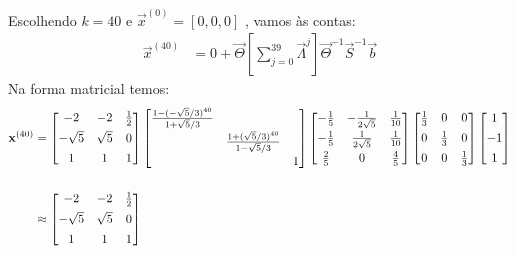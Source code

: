 \documentclass{homework}
\begin{document}
\begin{enumerate}[wide, leftmargin=80pt]
			Escolhendo $k = 40$ e $\vec{x}^{(0)} = \left[0, 0, 0\right]$ , vamos às contas:
			\begin{align*}
				\vec{x}^{(40)} &= 0 +  \vec{\Theta}\left[\sum_{j=0}^{39}\vec{\Lambda}^{j}\right]\vec{\Theta}^{-1} \vec{S}^{-1}\vec{b}
			\end{align*}
			Na forma matricial temos:
			\begin{align*}
				\vec{x}^{(40)} &=
				\left[ %
				\begin{array}{@{}ccc@{}}
				-2 & -2 & \frac{1}{2} \\[1ex]
				-\sqrt{5} & \sqrt{5} & 0 \\[1ex]
				1 & 1 & 1
				\end{array}
				\right] %
				\left[ %
				\begin{array}{@{}ccc@{}}
				\frac{1 - (-\sqrt{5}/3)^{40}}{1 + \sqrt{5}/3}& ~ & ~ \\[1ex]
				~ & \frac{1 + (\sqrt{5}/3)^{40}}{1 - \sqrt{5}/3} & ~ \\[1ex]
				~ & ~ & 1
				\end{array}
				\right] %
				\left[ %
				\begin{array}{@{}ccc@{}}
				-\frac{1}{5} & -\frac{1}{2 \sqrt{5}} & \frac{1}{10} \\[1ex]
				-\frac{1}{5} & \frac{1}{2 \sqrt{5}} & \frac{1}{10} \\[1ex]
				\frac{2}{5} & 0 & \frac{4}{5}
				\end{array}%
				\right]
				\left[%
				\begin{array}{@{}ccc@{}}
				\frac{1}{3} & 0 & 0 \\[1ex]
				0 & \frac{1}{3} & 0 \\[1ex]
				0 & 0 & \frac{1}{3}
				\end{array}
				\right]%
				\left[ %
				\begin{array}{@{}c@{}}
				1 \\[1ex]
				-1 \\[1ex]
				1 
				\end{array}
				\right]\\[0.5cm]
				&\approx
				\left[ %
				\begin{array}{@{}ccc@{}}
				-2 & -2 & \frac{1}{2} \\[1ex]
				-\sqrt{5} & \sqrt{5} & 0 \\[1ex]
				1 & 1 & 1 \\
				\end{array}
				\right] %

\end{align*}
\end{enumerate}
\end{document}
